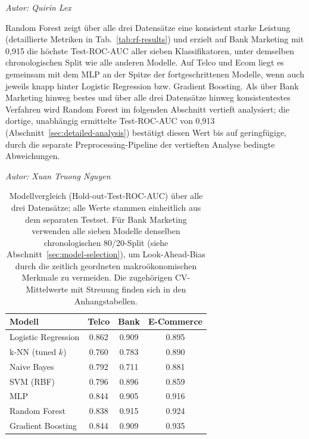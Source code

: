 \documentclass[10pt]{scrartcl}
\begin{document}
\begin{flushright}\textit{Autor: Quirin Lex}\end{flushright}

Random Forest zeigt über alle drei Datensätze eine konsistent starke Leistung (detaillierte Metriken in Tab.~\ref{tab:rf-results}) und erzielt auf Bank Marketing mit 0{,}915 die höchste Test-ROC-AUC aller sieben Klassifikatoren, unter demselben chronologischen Split wie alle anderen Modelle. Auf Telco und Ecom liegt es gemeinsam mit dem MLP an der Spitze der fortgeschrittenen Modelle, wenn auch jeweils knapp hinter Logistic Regression bzw. Gradient Boosting. Als über Bank Marketing hinweg bestes und über alle drei Datensätze hinweg konsistentestes Verfahren wird Random Forest im folgenden Abschnitt vertieft analysiert; die dortige, unabhängig ermittelte Test-ROC-AUC von 0{,}913 (Abschnitt~\ref{sec:detailed-analysis}) bestätigt diesen Wert bis auf geringfügige, durch die separate Preprocessing-Pipeline der vertieften Analyse bedingte Abweichungen.

\begin{flushright}\textit{Autor: Xuan Truong Nguyen}\end{flushright}

\begin{table}[ht]
\centering
\small
\caption{Modellvergleich (Hold-out-Test-ROC-AUC) über alle drei Datensätze; alle Werte stammen einheitlich aus dem separaten Testset. Für Bank Marketing verwenden alle sieben Modelle denselben chronologischen 80/20-Split (siehe Abschnitt~\ref{sec:model-selection}), um Look-Ahead-Bias durch die zeitlich geordneten makroökonomischen Merkmale zu vermeiden. Die zugehörigen CV-Mittelwerte mit Streuung finden sich in den Anhangstabellen.}
\label{tab:overall}
\begin{tabular}{lccc}
\toprule
Modell & Telco & Bank & E-Commerce \\
\midrule
Logistic Regression & 0.862 & 0.909 & 0.895 \\
k-NN (tuned $k$)    & 0.760 & 0.783 & 0.890 \\
Naive Bayes         & 0.792 & 0.711 & 0.881 \\
SVM (RBF)           & 0.796 & 0.896 & 0.859 \\
MLP                 & 0.844 & 0.905 & 0.916 \\
Random Forest       & 0.838 & 0.915 & 0.924 \\
Gradient Boosting   & 0.844 & 0.909 & 0.935 \\
\bottomrule
\end{tabular}
\end{table}
\end{document}
